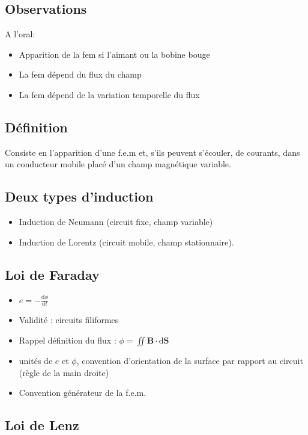 \documentclass[11pt]{report}
\numberwithin{figure}{section}
\numberwithin{equation}{section}
\numberwithin{table}{section}
\newcommand{\ud}{\mathrm{d}}
\newcommand{\1}{\boldsymbol{1}}
\begin{document}
\subsection*{Observations}

A l'oral:

\begin{itemize}
\item Apparition de la fem si l'aimant ou la bobine bouge
\item La fem dépend du flux du champ
\item La fem dépend de la variation temporelle du flux
\end{itemize}

\subsection{Définition}

Consiste en l'apparition d'une f.e.m et, s'ils peuvent s'écouler, de courants, dans un conducteur mobile placé d'un champ magnétique variable.

\subsection{Deux types d'induction}

\begin{itemize}
\item Induction de Neumann (circuit fixe, champ variable)
\item Induction de Lorentz (circuit mobile, champ stationnaire).
\end{itemize}

\subsection{Loi de Faraday}

\begin{itemize}
\item $e = - \frac{\ud \phi}{\ud t}$
\item Validité : circuits filiformes
\item Rappel définition du flux : $\phi = \iint \bm B \cdot \ud \bm S$
\item unités de $e$ et $\phi$, convention d'orientation de la surface par rapport au circuit (règle de la main droite)
\item Convention générateur de la f.e.m.
\end{itemize}

\subsection{Loi de Lenz}
\end{document}
